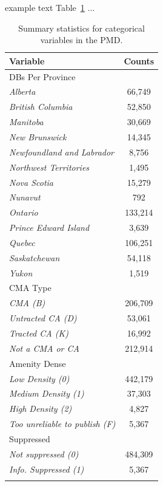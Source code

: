 \documentclass[11pt, a4paper]{article}
\begin{document}
example text Table~\ref{categorical} ...


\begin{longtable}{|l|c|}
\hline
\textbf{Variable}  & \textbf{Counts}  \\
\hline
{DBs Per Province} &  \\
\indent\indent \textit{Alberta} & 66,749 \\
\indent\indent \textit{British Columbia} & 52,850 \\
\indent\indent \textit{Manitoba} & 30,669 \\
\indent\indent \textit{New Brunswick} & 14,345 \\
\indent\indent \textit{Newfoundland and Labrador} & 8,756 \\
\indent\indent \textit{Northwest Territories} & 1,495 \\
\indent\indent \textit{Nova Scotia} & 15,279 \\
\indent\indent \textit{Nunavut} & 792 \\
\indent\indent \textit{Ontario} & 133,214 \\
\indent\indent \textit{Prince Edward Island} & 3,639 \\
\indent\indent \textit{Quebec} &  106,251 \\
\indent\indent \textit{Saskatchewan} & 54,118 \\
\indent\indent \textit{Yukon} & 1,519 \\
\hline

{CMA Type} &  \\
\indent\indent \textit{CMA (B)} & 206,709 \\
\indent\indent \textit{Untracted CA (D)} & 53,061 \\
\indent\indent \textit{Tracted CA (K)} & 16,992 \\
\indent\indent \textit{Not a CMA or CA} & 212,914 \\
\hline

{Amenity Dense} &  \\
\indent\indent \textit{Low Density (0)} & 442,179 \\
\indent\indent \textit{Medium Density (1)} & 37,303 \\
\indent\indent \textit{High Density (2)} & 4,827 \\
\indent\indent \textit{Too unreliable to publish (F)} & 5,367 \\
\hline

{Suppressed} &  \\
\indent\indent \textit{Not suppressed (0)} & 484,309 \\
\indent\indent \textit{Info. Suppressed (1)} & 5,367 \\
\hline

\caption[Summary of cateogrical variables]{Summary statistics for categorical variables in the PMD.}\label{categorical}
\end{longtable}
\end{document}
